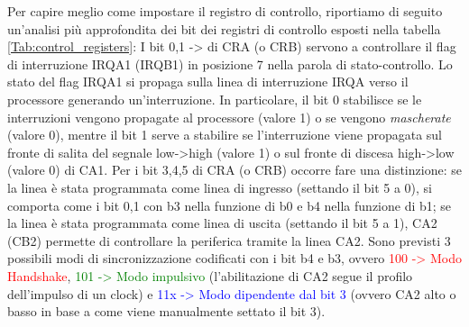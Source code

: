 
Per capire meglio come impostare il registro di controllo, riportiamo di seguito un'analisi più approfondita dei bit dei registri di controllo esposti nella tabella \ref{Tab:control_registers}:
I bit 0,1 -> di CRA (o CRB) servono a controllare il flag di interruzione IRQA1 (IRQB1) in posizione 7 nella parola di stato-controllo. Lo stato del flag IRQA1 si propaga sulla linea di interruzione IRQA verso il processore generando un'interruzione. In particolare, il bit 0 stabilisce se le interruzioni vengono propagate al processore (valore 1) o se vengono \textit{mascherate} (valore 0), mentre il bit 1 serve a stabilire se l'interruzione viene propagata sul fronte di salita del segnale low->high (valore 1) o sul fronte di discesa high->low (valore 0) di CA1.
Per i bit 3,4,5 di CRA (o CRB) occorre fare una distinzione: se la linea è stata programmata come linea di ingresso (settando il bit 5 a 0), si comporta come i bit 0,1 con b3 nella funzione di b0 e b4 nella funzione di b1; se la linea è stata programmata come linea di uscita (settando il bit 5 a 1), CA2 (CB2) permette di controllare la periferica tramite la linea CA2. Sono previsti 3 possibili modi di sincronizzazione codificati con i bit b4 e b3, ovvero \textcolor{red}{100 -> Modo Handshake}, \textcolor{green}{101 -> Modo impulsivo} (l'abilitazione di CA2 segue il profilo dell'impulso di un clock) e \textcolor{blue}{11x -> Modo dipendente dal bit 3} (ovvero CA2 alto o basso in base a come viene manualmente settato il bit 3).  



